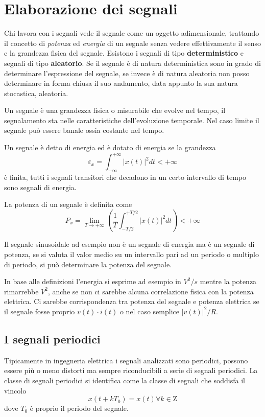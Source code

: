 
\chapter{Elaborazione dei segnali}

Chi lavora con i segnali vede il segnale come un oggetto adimensionale,
trattando il concetto di \textit{potenza} ed \textit{energia} di un segnale
senza vedere effettivamente il senso e la grandezza fisica del segnale.
Esistono i segnali di tipo \textbf{deterministico} e segnali di tipo
\textbf{aleatorio}.
Se il segnale è di natura deterministica sono in grado di determinare
l'espressione del segnale, se invece è di natura aleatoria non posso
determinare in forma chiusa il suo andamento, data appunto la sua natura
stocastica, aleatoria.

Un segnale è una grandezza fisica o misurabile che evolve nel tempo, il
segnalamento sta nelle caratteristiche dell'evoluzione temporale.
Nel caso limite il segnale può essere banale ossia costante nel tempo.

Un segnale è detto di energia ed è dotato di energia se la grandezza
\begin{equation}
 \varepsilon_x = \int_{-\infty}^{+\infty} |x(t)|^2 dt < +\infty
\end{equation}
è finita, tutti i segnali transitori che decadono in un certo intervallo di
tempo sono segnali di energia.

La potenza di un segnale è definita come
\begin{equation}
 P_x = \lim_{T\to+\infty} \left(\frac{1}{T}\int_{-T/2}^{+T/2} |x(t)|^2
dt\right) < +\infty
\label{eq:potenza_segnale}
\end{equation}

Il segnale sinusoidale ad esempio non è un segnale di energia ma è un segnale
di potenza, se si valuta il valor medio su un intervallo pari ad un periodo o
multiplo di periodo, si può determinare la potenza del segnale.

In base alle definizioni l'energia si esprime ad esempio in $V^2/s$ mentre la
potenza rimarrebbe $V^2$, anche se non ci sarebbe alcuna correlazione fisica con
la potenza elettrica. Ci sarebbe corrispondenza tra potenza del segnale e
potenza elettrica se il segnale fosse proprio $v(t)\cdot i(t)$ o nel caso
semplice $|v(t)|^2/R$.

\section{I segnali periodici}
Tipicamente in ingegneria elettrica i segnali analizzati sono periodici,
possono essere più o meno distorti ma sempre riconducibili a serie di segnali
periodici.
La classe di segnali periodici si identifica come la classe di segnali che
soddisfa il vincolo
$$
x(t+kT_0) = x(t) \forall k \in \mathrm{Z}
$$
dove $T_0$ è proprio il periodo del segnale.

